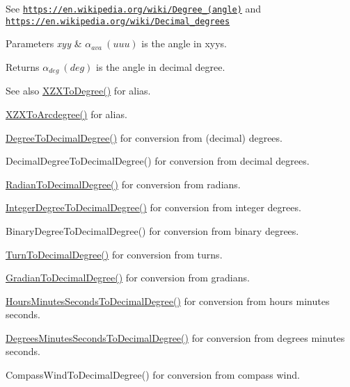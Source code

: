 See \href{https://en.wikipedia.org/wiki/Degree_(angle)}{\tt https\+://en.\+wikipedia.\+org/wiki/\+Degree\+\_\+(angle)} and \href{https://en.wikipedia.org/wiki/Decimal_degrees}{\tt https\+://en.\+wikipedia.\+org/wiki/\+Decimal\+\_\+degrees} 
\begin{DoxyParams}{Parameters}
{\em xyy} & $\alpha_{ava}\ (uuu)$ is the angle in xyys. \\
\hline
\end{DoxyParams}
\begin{DoxyReturn}{Returns}
$\alpha_{deg}\ (deg)$ is the angle in decimal degree. 
\end{DoxyReturn}
\begin{DoxySeeAlso}{See also}
\mbox{\hyperlink{group___e_g_x_math-_angle_conversions-_x_z_x_gaf91d111a3f3558dcd147d3832afc1fd6}{X\+Z\+X\+To\+Degree()}} for alias. 

\mbox{\hyperlink{group___e_g_x_math-_angle_conversions-_x_z_x_gade03c99ea870f58dcebd6307beed2364}{X\+Z\+X\+To\+Arcdegree()}} for alias. 

\mbox{\hyperlink{group___e_g_x_math-_angle_conversions-_degree_ga568afc1d436d425bf5d4edea584aee08}{Degree\+To\+Decimal\+Degree()}} for conversion from (decimal) degrees. 

Decimal\+Degree\+To\+Decimal\+Degree() for conversion from decimal degrees. 

\mbox{\hyperlink{group___e_g_x_math-_angle_conversions-_radian_ga6d170f1882c32de53167c04524d05f67}{Radian\+To\+Decimal\+Degree()}} for conversion from radians. 

\mbox{\hyperlink{group___e_g_x_math-_angle_conversions-_integer_degree_gac219c3198508ba984d8d81d22831b27d}{Integer\+Degree\+To\+Decimal\+Degree()}} for conversion from integer degrees. 

Binary\+Degree\+To\+Decimal\+Degree() for conversion from binary degrees. 

\mbox{\hyperlink{group___e_g_x_math-_angle_conversions-_turn_ga79231536255e77fb7a158b99a30c1767}{Turn\+To\+Decimal\+Degree()}} for conversion from turns. 

\mbox{\hyperlink{group___e_g_x_math-_angle_conversions-_gradian_ga346f47c519d5261b689cec49f4a8e789}{Gradian\+To\+Decimal\+Degree()}} for conversion from gradians. 

\mbox{\hyperlink{group___e_g_x_math-_angle_conversions-_hours_minutes_seconds_gad6662d1113ae8aea6baca6317888b4cd}{Hours\+Minutes\+Seconds\+To\+Decimal\+Degree()}} for conversion from hours minutes seconds. 

\mbox{\hyperlink{group___e_g_x_math-_angle_conversions-_degrees_minutes_seconds_gab4d4c25623f86611692c39eb29f16141}{Degrees\+Minutes\+Seconds\+To\+Decimal\+Degree()}} for conversion from degrees minutes seconds. 

Compass\+Wind\+To\+Decimal\+Degree() for conversion from compass wind. 
\end{DoxySeeAlso}
